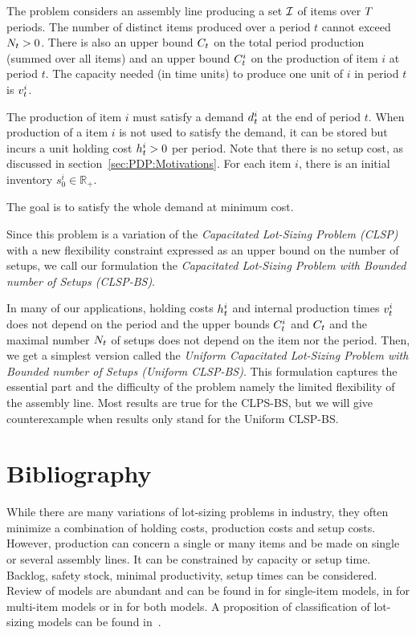 The problem considers an assembly line producing a set $\mathcal{I}$ of items over $T$ periods. The number of distinct items produced over a period $t$ cannot exceed $N_t>0$. There is also an upper bound $C_t$ on the total period production (summed over all items) and an upper bound $C_t^i$ on the production of item $i$ at period $t$. The capacity needed (in time units) to produce one unit of $i$ in period $t$ is $v_t^i$.

The production of item $i$ must satisfy a demand $d_t^i$ at the end of period $t$. When production of a item $i$ is not used to satisfy the demand, it can be stored but incurs a unit holding cost $h_t^i>0$ per period. Note that there is no setup cost, as discussed in section~\ref{sec:PDP:Motivations}. For each item $i$, there is an initial inventory $s_0^i\in\mathbb{R}_+$.

The goal is to satisfy the whole demand at minimum cost.

Since this problem is a variation of the \emph{Capacitated Lot-Sizing Problem (CLSP)} with a new flexibility constraint expressed as an upper bound on the number of setups, we call our formulation the \emph{Capacitated Lot-Sizing Problem with Bounded number of Setups (CLSP-BS)}.

In many of our applications, holding costs $h_t^i$ and internal production times $v_t^i$ does not depend on the period and the upper bounds $C_t^i$ and $C_t$ and the maximal number $N_t$ of setups does not depend on the item nor the period. Then, we get a simplest version called the \emph{Uniform Capacitated Lot-Sizing Problem with Bounded number of Setups (Uniform CLSP-BS)}. This formulation captures the essential part and the difficulty of the problem namely the limited flexibility of the assembly line. Most results are true for the CLPS-BS, but we will give counterexample when results only stand for the Uniform CLSP-BS.




\section{Bibliography}


While there are many variations of lot-sizing problems in industry, they often minimize a combination of holding costs, production costs and setup costs.
However, production can concern a single or many items and be made on single or several assembly lines.
It can be constrained by capacity or setup time.
Backlog, safety stock, minimal productivity, setup times can be considered.
Review of models are abundant and can be found in \cite{Geunes2014} for single-item models, in \cite{Gicquel2008} for multi-item models or in \cite{Karimi2003} for both models. A proposition of classification of lot-sizing models can be found in~\cite[Chapter 4 and 12]{Pochet2006}.

